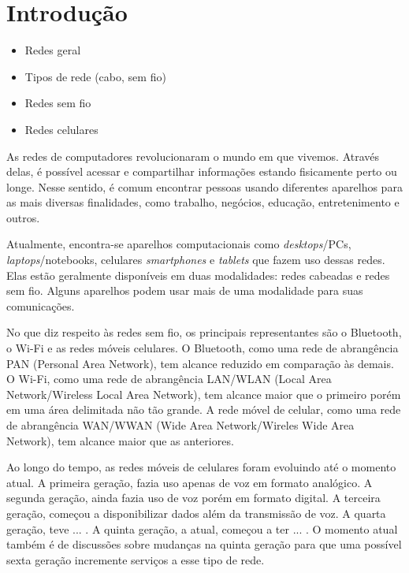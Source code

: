 \documentclass[11pt,oneside,a4paper]{abntex2}
\begin{document}


\maketitle

\section*{Introdução}
\label{intro}


\begin{itemize}
	\item Redes geral
	\item Tipos de rede (cabo, sem fio)
	\item Redes sem fio
	\item Redes celulares
\end{itemize}

As redes de computadores revolucionaram o mundo em que vivemos. Através delas, é possível acessar e compartilhar informações estando fisicamente perto ou longe. Nesse sentido, é comum encontrar pessoas usando diferentes aparelhos para as mais diversas finalidades, como trabalho, negócios, educação, entretenimento e outros.

Atualmente, encontra-se aparelhos computacionais como \textit{desktops}/PCs, \textit{laptops}/notebooks, celulares \textit{smartphones} e \textit{tablets} que fazem uso dessas redes. Elas estão geralmente disponíveis em duas modalidades: redes cabeadas e redes sem fio. Alguns aparelhos podem usar mais de uma modalidade para suas comunicações.

No que diz respeito às redes sem fio, os principais representantes são o Bluetooth, o Wi-Fi e as redes móveis celulares. O Bluetooth, como uma rede de abrangência PAN (Personal Area Network), tem alcance reduzido em comparação às demais. O Wi-Fi, como uma rede de abrangência LAN/WLAN (Local Area Network/Wireless Local Area Network), tem alcance maior que o primeiro porém em uma área delimitada não tão grande. A rede móvel de celular, como uma rede de abrangência WAN/WWAN (Wide Area Network/Wireles Wide Area Network)\cite{wwan}, tem alcance maior que as anteriores.

Ao longo do tempo, as redes móveis de celulares foram evoluindo até o momento atual. A primeira geração, fazia uso apenas de voz em formato analógico. A segunda geração, ainda fazia uso de voz porém em formato digital. A terceira geração, começou a disponibilizar dados além da transmissão de voz. A quarta geração, teve ... . A quinta geração, a atual, começou a ter ... . O momento atual também é de discussões sobre mudanças na quinta geração para que uma possível sexta geração incremente serviços a esse tipo de rede.
\end{document}
